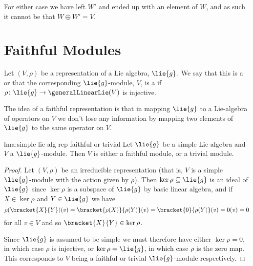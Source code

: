 \documentclass[fleqn]{NotesClass}
\begin{document}
    For either case we have left \(W'\) and ended up with an element of \(W\), and as such it cannot be that \(W \oplus W' = V\).
    
    \section{Faithful Modules}
    \begin{dfn}{}{}
        Let \((V, \rho)\) be a representation of a Lie algebra, \(\lie{g}\).
        We say that this is a  or that the corresponding \(\lie{g}\)-module, \(V\), is a  if \(\rho \colon \lie{g} \to \generalLinearLie(V)\) is injective.
    \end{dfn}
    
    The idea of a faithful representation is that in mapping \(\lie{g}\) to a Lie-algebra of operators on \(V\) we don't lose any information by mapping two elements of \(\lie{g}\) to the same operator on \(V\).
    
    \begin{lma}{}{lma:simple lie alg rep faithful or trivial}
        Let \(\lie{g}\) be a simple Lie algebra and \(V\) a \(\lie{g}\)-module.
        Then \(V\) is either a faithful module, or a trivial module.
        \begin{proof}
            Let \((V, \rho)\) be an irreducible representation (that is, \(V\) is a simple \(\lie{g}\)-module with the action given by \(\rho\)).
            Then \(\ker \rho \subseteq \lie{g}\) is an ideal of \(\lie{g}\) since \(\ker \rho\) is a subspace of \(\lie{g}\) by basic linear algebra, and if \(X \in \ker \rho\) and \(Y \in \lie{g}\) we have
            \begin{equation}
                \rho(\bracket{X}{Y})(v) = \bracket{\rho(X)}{\rho(Y)}(v) = \bracket{0}{\rho(Y)}(v) = 0(v) = 0
            \end{equation}
            for all \(v \in V\) and so \(\bracket{X}{Y} \in \ker \rho\).
            
            Since \(\lie{g}\) is assumed to be simple we must therefore have either \(\ker \rho = 0\), in which case \(\rho\) is injective, or \(\ker \rho = \lie{g}\), in which case \(\rho\) is the zero map.
            This corresponds to \(V\) being a faithful or trivial \(\lie{g}\)-module respectively.
        \end{proof}
    \end{lma}
    
\end{document}

